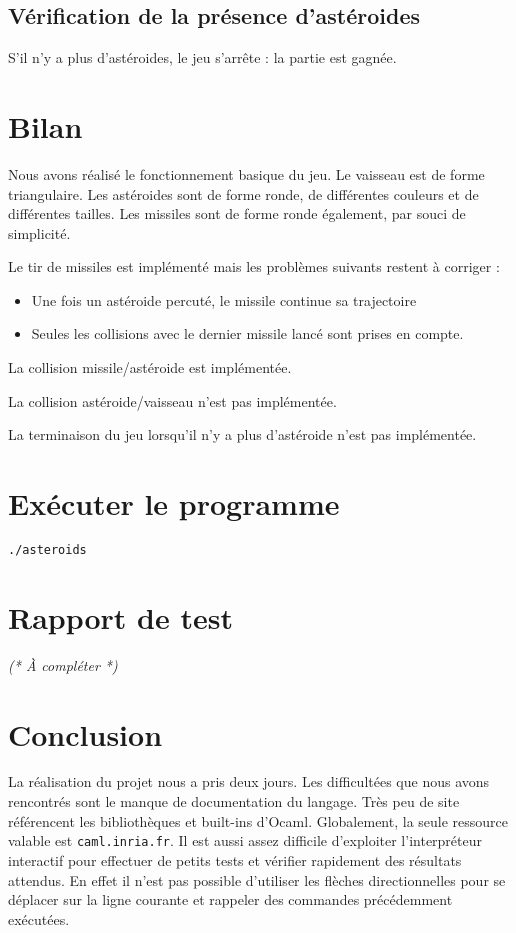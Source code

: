 \documentclass[a4paper,10pt,openany,oneside]{report}
\begin{document}
\subsection{Vérification de la présence d'astéroides}

S'il n'y a plus d'astéroides, le jeu s'arrête : la partie est gagnée.

\section{Bilan}

Nous avons réalisé le fonctionnement basique du jeu. Le vaisseau est de forme
triangulaire. Les astéroides sont de forme ronde, de différentes couleurs et de
différentes tailles. Les missiles sont de forme ronde également, par souci de
simplicité.

Le tir de missiles est implémenté mais les problèmes suivants restent à
corriger :

\begin{itemize}
  \item Une fois un astéroide percuté, le missile continue sa trajectoire
  \item Seules les collisions avec le dernier missile lancé sont prises en
    compte.
\end{itemize}

La collision missile/astéroide est implémentée.

La collision astéroide/vaisseau n'est pas implémentée.

La terminaison du jeu lorsqu'il n'y a plus d'astéroide n'est pas implémentée.

\section{Exécuter le programme}

\texttt{./asteroids}

\section{Rapport de test}

\textit{(* À compléter *)}

\section{Conclusion}

La réalisation du projet nous a pris deux jours. Les difficultées que nous
avons rencontrés sont le manque de documentation du langage. Très peu de site
référencent les bibliothèques et built-ins d'Ocaml. Globalement, la seule
ressource valable est \texttt{caml.inria.fr}. Il est aussi assez difficile
d'exploiter l'interpréteur interactif pour effectuer de petits tests et
vérifier rapidement des résultats attendus. En effet il n'est pas possible
d'utiliser les flèches directionnelles pour se déplacer sur la ligne courante
et rappeler des commandes précédemment exécutées.
\end{document}
